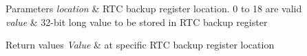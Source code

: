 \begin{DoxyParams}{Parameters}
{\em location} & R\+T\+C backup register location. 0 to 18 are valid \\
\hline
{\em value} & 32-\/bit long value to be stored in R\+T\+C backup register \\
\hline
\end{DoxyParams}

\begin{DoxyRetVals}{Return values}
{\em Value} & at specific R\+T\+C backup register location \\
\hline
\end{DoxyRetVals}
